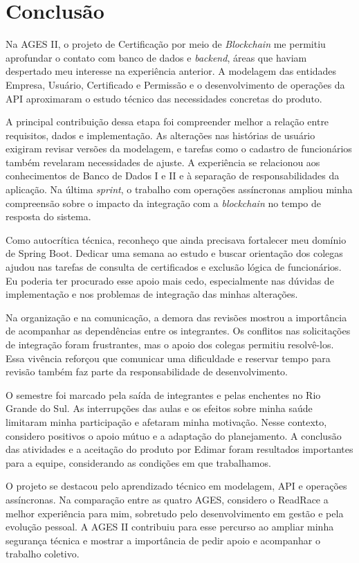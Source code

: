 \section{Conclusão}

Na \ac{AGES} II, o projeto de Certificação por meio de \textit{Blockchain} me permitiu aprofundar o contato com banco de dados e \textit{backend}, áreas que haviam despertado meu interesse na experiência anterior. A modelagem das entidades Empresa, Usuário, Certificado e Permissão e o desenvolvimento de operações da \ac{API} aproximaram o estudo técnico das necessidades concretas do produto.

A principal contribuição dessa etapa foi compreender melhor a relação entre requisitos, dados e implementação. As alterações nas histórias de usuário exigiram revisar versões da modelagem, e tarefas como o cadastro de funcionários também revelaram necessidades de ajuste. A experiência se relacionou aos conhecimentos de Banco de Dados I e II e à separação de responsabilidades da aplicação. Na última \textit{sprint}, o trabalho com operações assíncronas ampliou minha compreensão sobre o impacto da integração com a \textit{blockchain} no tempo de resposta do sistema.

Como autocrítica técnica, reconheço que ainda precisava fortalecer meu domínio de Spring Boot. Dedicar uma semana ao estudo e buscar orientação dos colegas ajudou nas tarefas de consulta de certificados e exclusão lógica de funcionários. Eu poderia ter procurado esse apoio mais cedo, especialmente nas dúvidas de implementação e nos problemas de integração das minhas alterações.

Na organização e na comunicação, a demora das revisões mostrou a importância de acompanhar as dependências entre os integrantes. Os conflitos nas solicitações de integração foram frustrantes, mas o apoio dos colegas permitiu resolvê-los. Essa vivência reforçou que comunicar uma dificuldade e reservar tempo para revisão também faz parte da responsabilidade de desenvolvimento.

O semestre foi marcado pela saída de integrantes e pelas enchentes no Rio Grande do Sul. As interrupções das aulas e os efeitos sobre minha saúde limitaram minha participação e afetaram minha motivação. Nesse contexto, considero positivos o apoio mútuo e a adaptação do planejamento. A conclusão das atividades e a aceitação do produto por Edimar foram resultados importantes para a equipe, considerando as condições em que trabalhamos.

O projeto se destacou pelo aprendizado técnico em modelagem, \ac{API} e operações assíncronas. Na comparação entre as quatro \ac{AGES}, considero o ReadRace a melhor experiência para mim, sobretudo pelo desenvolvimento em gestão e pela evolução pessoal. A \ac{AGES} II contribuiu para esse percurso ao ampliar minha segurança técnica e mostrar a importância de pedir apoio e acompanhar o trabalho coletivo.
